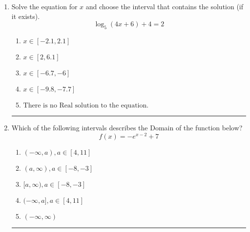 \documentclass[14pt]{extbook}
\newcommand{\litem}[1]{\item#1\hspace*{-1cm}\rule{\textwidth}{0.4pt}}
\begin{document}
\begin{enumerate}
{\begin{enumerate}[label=\Alph*.]
\end{enumerate} }
\litem{
Solve the equation for $x$ and choose the interval that contains the solution (if it exists).\[ \log_{5}{(4x+6)}+4 = 2 \]\begin{enumerate}[label=\Alph*.]
\item \( x \in [-2.1, 2.1] \)
\item \( x \in [2, 6.1] \)
\item \( x \in [-6.7, -6] \)
\item \( x \in [-9.8, -7.7] \)
\item \( \text{There is no Real solution to the equation.} \)

\end{enumerate} }
\litem{
Which of the following intervals describes the Domain of the function below?\[ f(x) = -e^{x-2}+7 \]\begin{enumerate}[label=\Alph*.]
\item \( (-\infty, a), a \in [4, 11] \)
\item \( (a, \infty), a \in [-8, -3] \)
\item \( [a, \infty), a \in [-8, -3] \)
\item \( (-\infty, a], a \in [4, 11] \)
\item \( (-\infty, \infty) \)

\end{enumerate} }
\end{enumerate}
\end{document}
